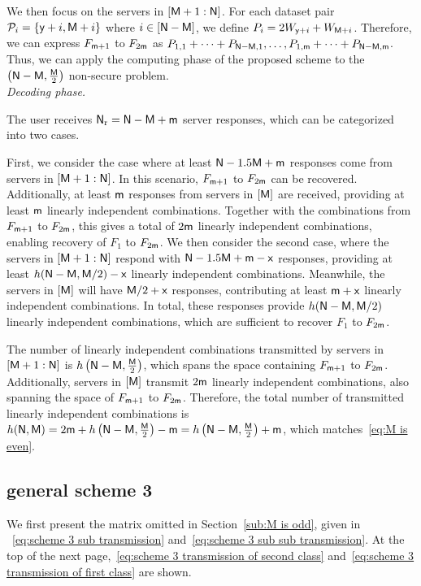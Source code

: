 \documentclass[conference,letterpaper]{IEEEtran}
\begin{document}
We then focus on the servers in $[{\sf M}+1: {\sf N}]$. For each dataset pair ${\cal P}_i = \{{\sf y}+i, {\sf M}+i\}$ where $i \in [{\sf N} - {\sf M}]$, we define $P_i = 2W_{{\sf y}+i} + W_{{\sf M}+i}$. Therefore, we can express $F_{{\sf m}+1}$ to $F_{2{\sf m}}$ as $P_{1,1} + \cdots + P_{{\sf N}-{\sf M},1}, \ldots, P_{1,{\sf m}} + \cdots + P_{{\sf N}-{\sf M},{\sf m}}$.
Thus, we can apply the computing phase of the proposed scheme to the $\left({\sf N} - {\sf M}, \frac{{\sf M}}{2}\right)$ non-secure problem.
\\

{\it Decoding phase.}

The user receives ${\sf N}_{\rm r} = {\sf N} - {\sf M} + {\sf m}$ server responses, which can be categorized into two cases.

First, we consider the case where at least ${\sf N} - 1.5{\sf M} + {\sf m}$ responses come from servers in $[{\sf M}+1 : {\sf N}]$. In this scenario, $F_{{\sf m}+1}$ to $F_{2{\sf m}}$ can be recovered. Additionally, at least ${\sf m}$ responses from servers in $[{\sf M}]$ are received, providing at least ${\sf m}$ linearly independent combinations. Together with the combinations from $F_{{\sf m}+1}$ to $F_{2{\sf m}}$, this gives a total of $2{\sf m}$ linearly independent combinations, enabling recovery of $F_1$ to $F_{2{\sf m}}$.
We then consider the second case, where the servers in $[{\sf M}+1: {\sf N}]$ respond with ${\sf N} - 1.5{\sf M} + {\sf m} - {\sf x}$ responses, providing at least $h({\sf N} - {\sf M}, {\sf M}/2) - {\sf x}$ linearly independent combinations. Meanwhile, the servers in $[{\sf M}]$ will have ${\sf M}/2 + {\sf x}$ responses, contributing at least ${\sf m} +{\sf x}$ linearly independent combinations. In total, these responses provide $h({\sf N} - {\sf M}, {\sf M}/2)$ linearly independent combinations, which are sufficient to recover $F_1$ to $F_{2{\sf m}}$.

The number of linearly independent combinations transmitted by servers in $[{\sf M}+1:{\sf N}]$ is $h\left({\sf N}-{\sf M}, \frac{{\sf M}}{2}\right)$, which spans the space containing $F_{{\sf m}+1}$ to $F_{2{\sf m}}$. Additionally, servers in $[{\sf M}]$ transmit $2{\sf m}$ linearly independent combinations, also spanning the space of $F_{{\sf m}+1}$ to $F_{2{\sf m}}$. Therefore, the total number of transmitted linearly independent combinations is $h({\sf N},{\sf M})= 2{\sf m} + h\left({\sf N}-{\sf M}, \frac{{\sf M}}{2}\right) - {\sf m} = h\left({\sf N}-{\sf M}, \frac{{\sf M}}{2}\right) + {\sf m}$, which matches~\eqref{eq:M is even}.
\\

\subsection{general scheme 3}
\label{general scheme 3}
\iffalse
We first present the matrix omitted in Section~\ref{sub:M is odd}, given in 
~\ref{eq:scheme 3 sub transmission} and~\ref{eq:scheme 3 sub sub transmission}. 
At the top of the next page,~\ref{eq:scheme 3 transmission of second class} 
and~\ref{eq:scheme 3 transmission of first class} are shown.
\end{document}
